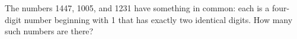 The numbers 1447, 1005, and 1231 have something in common: each is a four-digit number beginning with 1 that has exactly two identical digits.  How many such numbers are there?